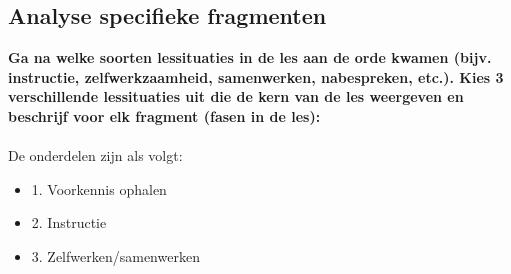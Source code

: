 \documentclass{article}
\begin{document}
        \subsection{Analyse specifieke fragmenten}
            \textbf{Ga na welke soorten lessituaties in de les aan de orde kwamen (bijv. instructie, zelfwerkzaamheid, samenwerken, nabespreken, etc.). Kies 3 verschillende lessituaties uit die de kern van de les weergeven en beschrijf voor elk fragment (fasen in de les): }
            \\\bigskip\\\bigskip
            De onderdelen zijn als volgt:
            \begin{itemize}
                \item 1. Voorkennis ophalen
                \item 2. Instructie
                \item 3. Zelfwerken/samenwerken
            \end{itemize}
            \\\smallskip
\end{document}
